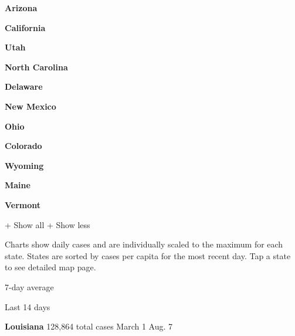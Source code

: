 \textbf{Arizona}

\href{https://www.nytimes.com/interactive/2020/us/california-coronavirus-cases.html}{}

\textbf{California}

\href{https://www.nytimes.com/interactive/2020/us/utah-coronavirus-cases.html}{}

\textbf{Utah}

\href{https://www.nytimes.com/interactive/2020/us/north-carolina-coronavirus-cases.html}{}

\textbf{North Carolina}

\href{https://www.nytimes.com/interactive/2020/us/delaware-coronavirus-cases.html}{}

\textbf{Delaware}

\href{https://www.nytimes.com/interactive/2020/us/new-mexico-coronavirus-cases.html}{}

\textbf{New Mexico}

\href{https://www.nytimes.com/interactive/2020/us/ohio-coronavirus-cases.html}{}

\textbf{Ohio}

\href{https://www.nytimes.com/interactive/2020/us/colorado-coronavirus-cases.html}{}

\textbf{Colorado}

\href{https://www.nytimes.com/interactive/2020/us/wyoming-coronavirus-cases.html}{}

\textbf{Wyoming}

\href{https://www.nytimes.com/interactive/2020/us/maine-coronavirus-cases.html}{}

\textbf{Maine}

\href{https://www.nytimes.com/interactive/2020/us/vermont-coronavirus-cases.html}{}

\textbf{Vermont}

+ Show all + Show less

Charts show daily cases and are individually scaled to the maximum for
each state. States are sorted by cases per capita for the most recent
day. Tap a state to see detailed map page.

\href{https://www.nytimes.com/interactive/2020/us/louisiana-coronavirus-cases.html}{}

7-day average

Last 14 days

\textbf{Louisiana} 128,864 total cases March 1 Aug. 7

\href{https://www.nytimes.com/interactive/2020/us/mississippi-coronavirus-cases.html}{}

